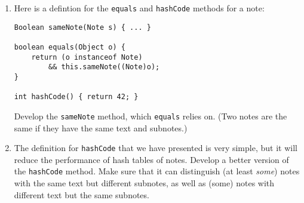 \documentclass[12pt]{article}                   %
\begin{document}
\begin{problem}
\begin{enumerate}

\ifrubric
\else
{}
\fi
\newpage

\noindent
\item Here is a defintion for the \texttt{equals} and \texttt{hashCode}
methods for a note:

\begin{verbatim}
Boolean sameNote(Note s) { ... }

boolean equals(Object o) {
    return (o instanceof Note) 
        && this.sameNote((Note)o);
}

int hashCode() { return 42; }
\end{verbatim}

\noindent
Develop the \texttt{sameNote} method, which \texttt{equals} relies on.
(Two notes are the same if they have the same text and subnotes.)

\ifrubric
\else
{}
\fi
\newpage

\noindent
\item The definition for \texttt{hashCode} that we have presented is
  very simple, but it will reduce the performance of hash tables of
  notes.  Develop a better version of the \texttt{hashCode} method.
  Make sure that it can distinguish (at least \emph{some}) notes with
  the same text but different subnotes, as well as (some)
  notes with different text but the same subnotes.

\ifrubric
\else
{}
\fi
\newpage
\newpage
\end{enumerate}
\end{problem}


\end{document}

